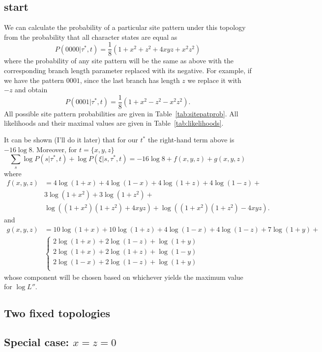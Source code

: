 \subsection{start}

We can calculate the probability of a particular site pattern under this topology from the probability that all character states are equal as
$$
P(0000|\tau^*,t) = \frac{1}{8}(1+x^2+z^2+4xyz+x^2z^2)
$$
where the probability of any site pattern will be the same as above with the corresponding branch length parameter replaced with its negative.
For example, if we have the pattern $0001$, since the last branch has length $z$ we replace it with $-z$ and obtain
$$
P(0001|\tau^*,t) = \frac{1}{8}(1+x^2-z^2-x^2z^2).
$$
All possible site pattern probabilities are given in Table~\ref{tab:sitepatprob}.
All likelihoods and their maximal values are given in Table~\ref{tab:likelihoods}.

It can be shown (I'll do it later) that for our $t^*$ the right-hand term above is $-16\log 8$.
Moreover, for $t=\{x,y,z\}$
\begin{equation}
\sum_{s} \log P(s | \tau^*, t) + \log P(\xi | s, \tau^*, t) = -16\log 8 + f(x,y,z) + g(x,y,z)
\end{equation}
where
\begin{align}
f(x,y,z) &= 4\log(1+x)+4\log(1-x)+4\log(1+z)+4\log(1-z)+\\
& 3\log(1+x^2)+3\log(1+z^2)+\\
& \log((1+x^2)(1+z^2)+4xyz) + \log((1+x^2)(1+z^2)-4xyz).
\end{align}
and
\begin{align}
g(x,y,z) &= 10\log(1+x)+10\log(1+z)+4\log(1-x)+4\log(1-z)+7\log(1+y)+\\
& \left\{ 
  \begin{array}{l}
  2\log(1+x)+2\log(1-z)+\log(1+y)\\
  2\log(1+x)+2\log(1+z)+\log(1-y)\\
  2\log(1-x)+2\log(1-z)+\log(1+y)\\
  \end{array} \right.
\end{align}
whose component will be chosen based on whichever yields the maximum value for $\log L''$.

\subsection{Two fixed topologies}

\subsection{Special case: $x=z=0$}

